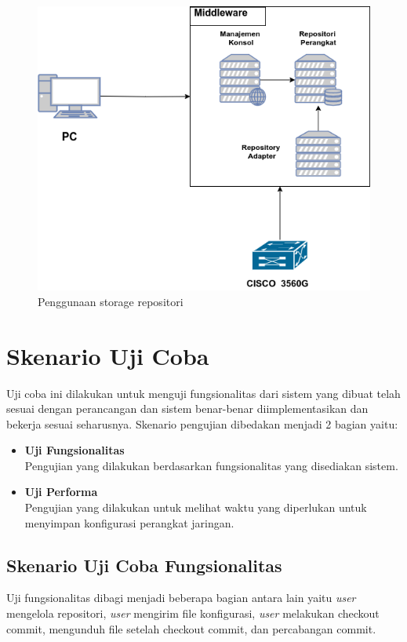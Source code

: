 	\begin{figure}[H]
		\centering
		\includegraphics[width=\textwidth]{Images/C-5/Lingkungan-uji-coba.png}
		\caption{Penggunaan storage repositori}
		\label{lingkungan uji coba}
	\end{figure}

\section{Skenario Uji Coba}
Uji coba ini dilakukan untuk menguji fungsionalitas dari sistem yang dibuat telah sesuai dengan perancangan dan sistem benar-benar diimplementasikan dan bekerja sesuai seharusnya. Skenario pengujian dibedakan menjadi 2 bagian yaitu:
\begin{itemize}
	\item \textbf{Uji Fungsionalitas} \\
	Pengujian yang dilakukan berdasarkan fungsionalitas yang disediakan sistem.
	\item \textbf{Uji Performa} \\
	Pengujian yang dilakukan untuk melihat waktu yang diperlukan untuk menyimpan konfigurasi perangkat jaringan.
\end{itemize}  
	
    
    
    \subsection{Skenario Uji Coba Fungsionalitas}
    Uji fungsionalitas dibagi menjadi beberapa bagian antara lain yaitu \textit{user} mengelola repositori, \textit{user} mengirim file konfigurasi, \textit{user} melakukan checkout commit, mengunduh file setelah checkout commit, dan percabangan commit.
    	
